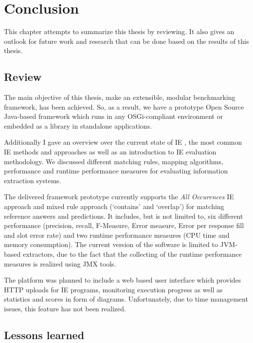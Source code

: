 \section{Conclusion}
\label{sec:conclusion}
This chapter attempts to summarize this thesis by reviewing. It also gives an outlook for future work and research that can be done based on the results of this thesis.

\subsection{Review}
The main objective of this thesis, make an extensible, modular benchmarking framework, has been achieved. So, as a result, we have a prototype Open Source Java-based framework which runs in any \gls{OSGi}-compliant environment or embedded as a library in standalone applications.

Additionally I gave an overview over the current state of \gls{IE} , the most common \gls{IE} methods and approaches as well as an introduction to \gls{IE} evaluation methodology. We discussed different matching rules, mapping algorithms, performance and runtime performance measures for evaluating information extraction systems.

The delivered framework prototype currently supports the \textit{All Occurences} \gls{IE} approach and mixed rule approach (\enquote*{contains} and \enquote*{overlap}) for matching reference answers and predictions. It includes, but is not limited to, six different performance (precision, recall, F-Measure, Error measure, Error per response fill and slot error rate) and two runtime performance measures (CPU time and memory consumption). The current version of the software is limited to \gls{JVM}-based extractors, due to the fact that the collecting of the runtime performance measures is realized using \acs{JMX} tools.

The platform was planned to include a web based user interface which provides HTTP uploads for IE programs, monitoring execution progress as well as statistics and scores in form of diagrams. Unfortunately, due to time management issues, this feature has not been realized.

\subsection{Lessons learned}


